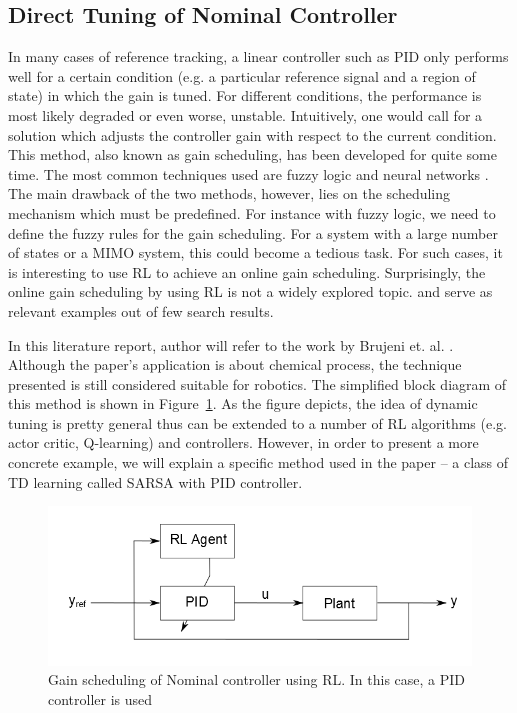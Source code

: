 \subsection{Direct Tuning of Nominal Controller}
In many cases of reference tracking, a linear controller such as \ac{PID} only performs well for a certain condition (e.g. a particular reference signal and a region of state) in which the gain is tuned. For different conditions, the performance is most likely degraded or even worse, unstable. Intuitively, one would call for a solution which adjusts the controller gain with respect to the current condition. This method, also known as gain scheduling, has been developed for quite some time. The most common techniques used are fuzzy logic \cite{375142} \cite{5229855} \cite{1684589} and neural networks \cite{6606304} \cite{572744} \cite{556252}. The main drawback of the two methods, however, lies on the scheduling mechanism which must be predefined. For instance with fuzzy logic, we need to define the fuzzy rules for the gain scheduling. For a system with a large number of states or a \ac {MIMO} system, this could become a tedious task. For such cases, it is interesting to use \ac {RL} to achieve an online gain scheduling. Surprisingly, the online gain scheduling by using \ac {RL} is not a widely explored topic. \cite{882916} and \cite{Brujeni5669655} serve as relevant examples out of few search results.

In this literature report, author will refer to the work by Brujeni et. al. \cite{Brujeni5669655}. Although the paper's application is about chemical process, the technique presented is still considered suitable for robotics. The simplified block diagram of this method is shown in Figure~\ref{fig:dynamictuning}. As the figure depicts, the idea of dynamic tuning is pretty general thus can be extended to a number of \ac {RL} algorithms (e.g. actor critic, Q-learning) and controllers. However, in order to present a more concrete example, we will explain a specific method used in the paper -- a class of \ac {TD} learning called \ac{SARSA} with \ac{PID} controller. 

\begin{figure}[h!]
	\centering
	\includegraphics[width=0.7\linewidth]{dynamictuning}
	\caption{Gain scheduling of Nominal controller using \ac {RL}. In this case, a \ac{PID} controller is used}
	\label{fig:dynamictuning}
\end{figure}

